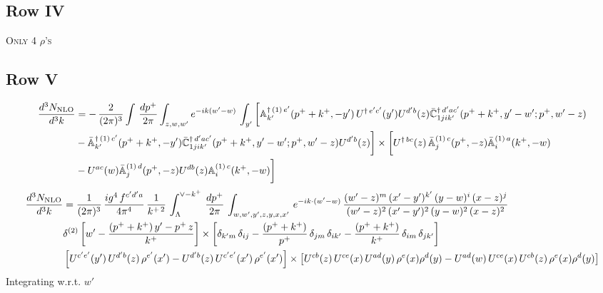 \documentclass[9pt]{article}
\def\mf#1{\mathbb{#1}}
\numberwithin{equation}{section}
\begin{document}
\subsection{Row IV\,}
\textsc{Only 4 $\rho$'s}
\subsection{Row V\,}
\begin{align}
 \frac{d^{3}N_{\rm NLO}}{d^{3}k} & =   -\,\frac{2}{(2\pi)^{3}} \int\, \frac{dp^{+}}{2\pi}\int_{z,w,w^{\prime}} e^{-ik(w^{\prime}-w)}\,\int_{y^{\prime}}\bigg[\mf{A}^{\dagger\, (1)\,e^{\prime}}_{k^{\prime}}(p^{+}+k^{+},-y^{\prime})\,U^{\dagger\, e^{\prime}c^{\prime}}(y^{\prime})U^{d^{\prime}b}(z) \Bar{\mf{C}}^{\dagger\, d^{\prime}ac^{\prime}}_{1jik^{\prime}}(p^{+}+k^{+},y^{\prime}-w^{\prime}; p^{+},w^{\prime}-z) \notag \\ & -\Bar{\mf{A}}^{\dagger\, (1)\,c^{\prime}}_{k^{\prime}}(p^{+}+k^{+},-y^{\prime}) \Bar{\mf{C}}^{\dagger\, d^{\prime}ac^{\prime}}_{1jik^{\prime}}(p^{+}+k^{+},y^{\prime}-w^{\prime}; p^{+},w^{\prime}-z)U^{d^{\prime}b}(z)\bigg] \times  \bigg[U^{\dagger\,bc}(z)\,\Bar{\mf{A}}^{(1)\, c}_{j}(p^{+},-z)\Bar{\mf{A}}^{(1)\, a}_{i}(k^{+},-w)\notag \\ & -U^{ac}(w) \Bar{\mf{A}}^{(1)\, d}_{j}(p^{+},-z)U^{db}(z) \mf{A}^{(1)\, c}_{i}(k^{+},- w)\bigg]\nonumber
\end{align}
\begin{align}
     \frac{d^{3}N_{\rm NLO}}{d^{3}k} & = \frac{1}{(2\pi)^{3}}\,\frac{ig^{4}\,f^{c'd'a}}{4\pi^{4}}\, \frac{1}{k^{+\,2}}\,\int_{\Lambda}^{\vee-k^{+}}\, \frac{dp^{+}}{2\pi}\, \int_{w,w',y',z,y,x,x'}\, e^{-ik\cdot (w'-w)}\, \frac{(w'-z)^{m}\,(x'-y')^{k'}\,(y-w)^{i}\,(x-z)^{j}}{(w'-z)^{2}\,(x'-y')^{2}\,(y-w)^{2}\,(x-z)^{2}}\notag \\ & \delta^{(2)}\left[w'-\frac{(p^{+}+k^{+})\,y'-p^{+}\,z}{k^{+}}\right]\times \left[\delta_{k'm}\,\delta_{ij}-\frac{(p^{+}+k^{+})}{p^{+}}\,\delta_{jm}\,\delta_{ik'}-\frac{(p^{+}+k^{+})}{k^{+}}\, \delta_{im}\, \delta_{jk'}\right]\notag \\ & \left[U^{c'e'}(y')\,U^{d'b}(z)\,\rho^{e'}(x')-U^{d'b}(z)\,U^{c'e'}(x')\,\rho^{e'}(x')\right]\times \left[U^{cb}(z)\,U^{ce}(x)\,U^{ad}(y)\,\rho^{e}(x)\rho^{d}(y)-U^{ad}(w)\,U^{ce}(x)\,U^{cb}(z)\,\rho^{e}(x)\rho^{d}(y)\right]
\end{align}
Integrating w.r.t. $w'$
\end{document}
